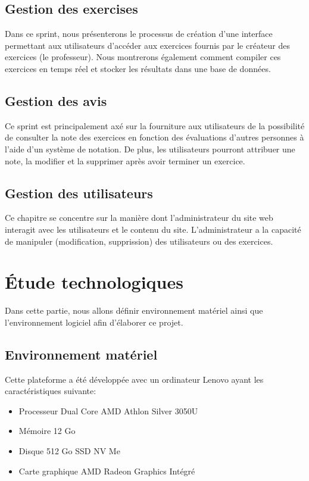  \subsection {\normal {}Gestion des exercises}
 Dans ce sprint, nous présenterons le processus de création d'une interface permettant aux utilisateurs d'accéder aux exercices fournis par le créateur des exercices (le professeur). Nous montrerons également comment compiler ces exercices en temps réel et stocker les résultats dans une base de données.
 
 \subsection {\normal {}Gestion des avis}
Ce sprint est principalement axé sur la fourniture aux utilisateurs de la possibilité de consulter la note des exercices en fonction des évaluations d'autres personnes à l'aide d'un système de notation. De plus, les utilisateurs pourront attribuer une note, la modifier et la supprimer après avoir terminer un exercice.

 \subsection {\normal {}Gestion des utilisateurs}
Ce chapitre se concentre sur la manière dont l'administrateur du site web interagit avec les utilisateurs et le contenu du site. L'administrateur a la capacité de manipuler (modification, supprission) des utilisateurs ou des exercices.















\section{Étude technologiques}
Dans cette partie, nous allons définir environnement matériel ainsi
que l’environnement logiciel afin d’élaborer ce projet.
\subsection{Environnement matériel}  
Cette plateforme a été développée avec un ordinateur Lenovo ayant les caractéristiques suivante:
\begin{itemize}
    \item  Processeur Dual Core AMD Athlon Silver 3050U   
      \item  Mémoire 12 Go
    \item Disque 512 Go SSD NV Me
    \item Carte graphique AMD Radeon Graphics Intégré 
\end{itemize}

